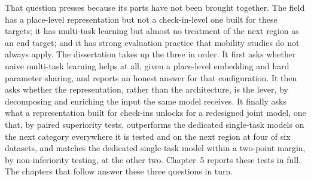 That question presses because its parts have not been brought together. The field has
a place-level representation but not a check-in-level one built for these targets; it
has multi-task learning but almost no treatment of the next region as an end target;
and it has strong evaluation practice that mobility studies do not always apply. The
dissertation takes up the three in order. It first asks whether naive multi-task
learning helps at all, given a place-level embedding and hard parameter sharing, and
reports an honest answer for that configuration. It then asks whether the
representation, rather than the architecture, is the lever, by decomposing and
enriching the input the same model receives. It finally asks what a representation
built for check-ins unlocks for a redesigned joint model, one that, by paired
superiority tests, outperforms the dedicated single-task models on the next category
everywhere it is tested and on the next region at four of six datasets, and matches the
dedicated single-task model within a two-point margin, by non-inferiority testing, at
the other two. Chapter~5 reports these tests in full. The chapters that follow answer
these three questions in turn.

